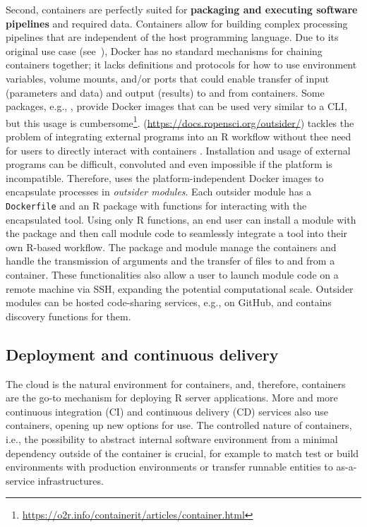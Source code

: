 \label{pipelines} Second, containers are perfectly suited for
\textbf{packaging and executing software pipelines} and required data.
Containers allow for building complex processing pipelines that are
independent of the host programming language. Due to its original use
case (see~), Docker has no standard mechanisms for
chaining containers together; it lacks definitions and protocols for how
to use environment variables, volume mounts, and/or ports that could
enable transfer of input (parameters and data) and output (results) to
and from containers. Some packages, e.g., , provide
Docker images that can be used very similar to a CLI, but this usage is
cumbersome\footnote{\href{https://o2r.info/containerit/articles/container.html}{https://o2r.info/containerit/articles/container.html}}.
\textbf{} (\url{https://docs.ropensci.org/outsider/})
tackles the problem of integrating external programs into an R workflow
without thee need for users to directly interact with containers
\citep{bennett_outsider_2020}. Installation and usage of external
programs can be difficult, convoluted and even impossible if the
platform is incompatible. Therefore,  uses the
platform-independent Docker images to encapsulate processes in
\emph{outsider modules}. Each outsider module has a \texttt{Dockerfile}
and an R package with functions for interacting with the encapsulated
tool. Using only R functions, an end user can install a module with the
 package and then call module code to seamlessly integrate
a tool into their own R-based workflow. The  package and
module manage the containers and handle the transmission of arguments
and the transfer of files to and from a container. These functionalities
also allow a user to launch module code on a remote machine via SSH,
expanding the potential computational scale. Outsider modules can be
hosted code-sharing services, e.g., on GitHub, and 
contains discovery functions for them.

\hypertarget{deployment-and-continuous-delivery}{%
\subsection{Deployment and continuous
delivery}\label{deployment-and-continuous-delivery}}

\label{deployment}

The cloud is the natural environment for containers, and, therefore,
containers are the go-to mechanism for deploying R server applications.
More and more continuous integration (CI) and continuous delivery (CD)
services also use containers, opening up new options for use. The
controlled nature of containers, i.e., the possibility to abstract
internal software environment from a minimal dependency outside of the
container is crucial, for example to match test or build environments
with production environments or transfer runnable entities to
as-a-service infrastructures.

